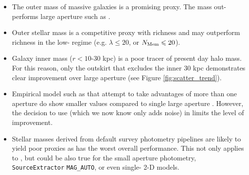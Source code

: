 \documentclass[fleqn,usenatbib,useAMS]{mnras}
\begin{document}
    \begin{itemize}
    
        \item The outer mass of massive galaxies is a promising \mvir{} proxy. 
            The  mass out-performs large aperture \mstar{} such as .
        
        \item Outer stellar mass is a competitive proxy with richness and may outperform richness in
            the low-\mvir{} regime (e.g. $\lambda \leq 20$, or $N_{\rm Mem} \leq 20$).
        
        \item Galaxy inner mass ($r< 10$-30 kpc) is a poor tracer of present day halo mass.
            For this reason, only the outskirt \mstar{} that excludes the inner 30 kpc demonstrates 
            clear improvement over large aperture \mstar{} (see Figure \ref{fig:scatter_trend}).
        
        \item Empirical model such as \asap{} that attempt to take advantages of more than one 
            aperture \mstar{} do show smaller \sigmvir{} values compared to single large aperture
            \mstar{}.
            However, the decision to use  (which we now know only adds noise) in
            \citet{Huang2020} limits the level of improvement.

        \item Stellar masses derived from default survey photometry pipelines are likely to yield
            poor \mvir{} proxies as \mcmodel{} has the worst overall performance.
            This not only applies to \cmodel{}, but could be also true for the small aperture
            photometry, \texttt{SourceExtractor} \texttt{MAG\_AUTO}, or even single-\ser{} 2-D
            models.
            
    \end{itemize}
\end{document}
